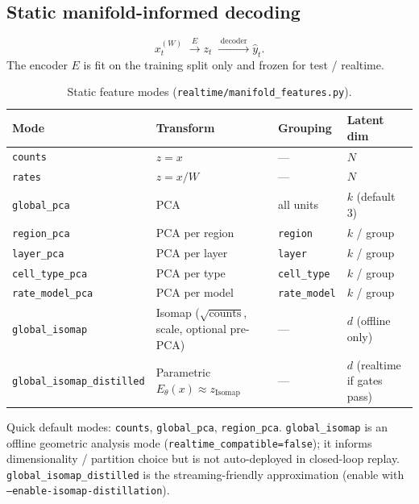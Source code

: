 \documentclass[11pt,a4paper]{article}
\begin{document}
\subsection{Static manifold-informed decoding}
\begin{equation}
  x_t^{(W)}
  \;\xrightarrow{\;E\;}
  z_t
  \;\xrightarrow{\;\mathrm{decoder}\;}
  \hat y_t.
\end{equation}
The encoder $E$ is fit on the training split only and frozen for test / realtime.

\begin{table}[h]
\centering
\caption{Static feature modes (\texttt{realtime/manifold\_features.py}).}
\label{tab:manifolds}
\small
\begin{tabular}{@{}llll@{}}
\toprule
Mode & Transform & Grouping & Latent dim \\
\midrule
\texttt{counts} & $z=x$ & --- & $N$ \\
\texttt{rates} & $z=x/W$ & --- & $N$ \\
\texttt{global\_pca} & PCA & all units & $k$ (default 3) \\
\texttt{region\_pca} & PCA per region & \texttt{region} & $k$ / group \\
\texttt{layer\_pca} & PCA per layer & \texttt{layer} & $k$ / group \\
\texttt{cell\_type\_pca} & PCA per type & \texttt{cell\_type} & $k$ / group \\
\texttt{rate\_model\_pca} & PCA per model & \texttt{rate\_model} & $k$ / group \\
\texttt{global\_isomap} & Isomap ($\sqrt{\mathrm{counts}}$, scale, optional pre-PCA) & --- & $d$ (offline only) \\
\texttt{global\_isomap\_distilled} & Parametric $E_\theta(x)\approx z_{\mathrm{Isomap}}$ & --- & $d$ (realtime if gates pass) \\
\bottomrule
\end{tabular}
\end{table}

Quick default modes: \texttt{counts}, \texttt{global\_pca}, \texttt{region\_pca}.
\texttt{global\_isomap} is an offline geometric analysis mode (\texttt{realtime\_compatible=false}); it informs dimensionality / partition choice but is not auto-deployed in closed-loop replay.
\texttt{global\_isomap\_distilled} is the streaming-friendly approximation (enable with \texttt{--enable-isomap-distillation}).
\end{document}
